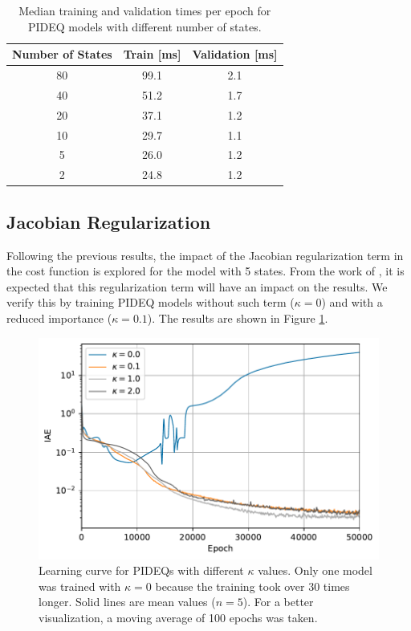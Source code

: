 \begin{table}[h]
    \centering
    \caption{Median training and validation times per epoch for \gls{PIDEQ} models with different number of states.}
    \label{tab:n-states-times}
    \begin{tabular}{ccc}
	\toprule
	\textbf{Number of States} & \textbf{Train} [ms] & \textbf{Validation} [ms] \\ \midrule
	80       & 99.1       & 2.1             \\
	40       & 51.2       & 1.7             \\
	20       & 37.1       & 1.2             \\
	10       & 29.7       & 1.1             \\
	5        & 26.0       & 1.2             \\
	2        & 24.8       & 1.2             \\ \bottomrule
    \end{tabular}
\end{table}

\subsection{Jacobian Regularization}

Following the previous results, the impact of the Jacobian regularization term in the cost function is explored for the model with 5 states.
From the work of \textcite{bai_stabilizing_2021}, it is expected that this regularization term will have an impact on the results.
We verify this by training \gls{PIDEQ} models without such term ($\kappa=0$) and with a reduced importance ($\kappa=0.1$).
The results are shown in Figure \ref{fig:jac-lamb-iae}.

\begin{figure}[h]
    \centering
    \includegraphics{images/exp_4_iae.pdf}
    \caption{Learning curve for \gls{PIDEQ}s with different $\kappa$ values. Only one model was trained with $\kappa=0$ because the training took over 30 times longer. Solid lines are mean values ($n=5$). For a better visualization, a moving average of 100 epochs was taken.}
    \label{fig:jac-lamb-iae}
\end{figure}

